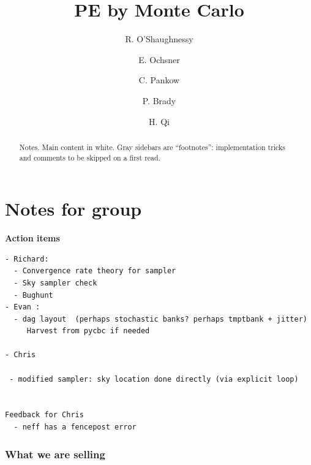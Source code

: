 \documentclass[twocolumn,prd,nofootinbib]{revtex4}
\begin{document}
\title{PE by Monte Carlo}
\author{R. O'Shaughnessy}
\author{E. Ochsner}
\author{C. Pankow}
\author{P. Brady}
\author{H. Qi}
\begin{abstract}
Notes. Main content in white.  Gray sidebars are ``footnotes'': implementation tricks and comments to be skipped on a
first read.
\end{abstract}
\maketitle
\tableofcontents
\part{Notes for group}
\nocite{gwastro-HarryFairhurst-CoherentTargetedSearch}


\begin{widetext}

\noindent \textbf{Action items}

\begin{verbatim}
- Richard:
  - Convergence rate theory for sampler
  - Sky sampler check
  - Bughunt
- Evan : 
  - dag layout  (perhaps stochastic banks? perhaps tmptbank + jitter)
     Harvest from pycbc if needed

- Chris

 - modified sampler: sky location done directly (via explicit loop)


Feedback for Chris
  - neff has a fencepost error

\end{verbatim}
\end{widetext}





\section{What we are selling}
\end{document}
